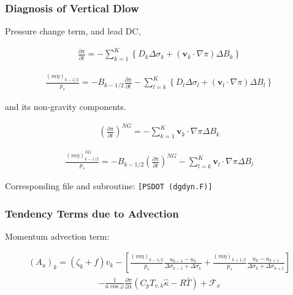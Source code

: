 \hypertarget{diagnosis-of-vertical-dlow}{%
\subsubsection{Diagnosis of Vertical
Dlow}\label{diagnosis-of-vertical-dlow}}

Pressure change term, and lead DC,

\begin{eqnarray}
  \frac{\partial \pi}{\partial t}
   = - \sum_{k=1}^{K} \left\{ D_k \Delta\sigma_k + ({\mathbf{v}}_k \cdot \nabla \pi)\Delta B_k \right\}
\end{eqnarray}

\begin{eqnarray}
  \frac{(m\dot{\eta})_{k-1/2}}{p_s}
   = - B_{k-1/2} \frac{\partial \pi}{\partial t}
    - \sum_{l=k}^{K}\left\{ D_l \Delta\sigma_l + ({\mathbf{v}}_l \cdot \nabla \pi)\Delta B_l \right\}
\end{eqnarray}

and its non-gravity components.

\begin{eqnarray}
  \left( \frac{\partial \pi}{\partial t} \right)^{NG}
   =   - \sum_{k=1}^{K} {\mathbf{v}}_{k} \cdot \nabla \pi  
       \Delta B_{k}
\end{eqnarray}

\begin{eqnarray}
  \frac{(m\dot{\eta})^{NG}_{k-1/2}}{p_s}
   = - B_{k-1/2} \left( \frac{\partial \pi}{\partial t} \right)^{NG}
    - \sum_{l=k}^{K} {\mathbf{v}}_{l} \cdot \nabla \pi
       \Delta B_{l}
\end{eqnarray}

Corresponding file and subroutine: \texttt{{[}PSDOT\ (dgdyn.F){]}}

\hypertarget{tendency-terms-due-to-advection}{%
\subsubsection{Tendency Terms due to
Advection}\label{tendency-terms-due-to-advection}}

Momentum advection term:

\begin{eqnarray}
  (A_u)_k
    =  ( \zeta_k + f ) v_k
             - \left[ \frac{(m\dot{\eta})_{k-1/2}}{p_s} \frac{u_{k-1} - u_k}{\Delta\sigma_{k-1}+\Delta\sigma_k}
               + \frac{(m\dot{\eta})_{k+1/2}}{p_s} \frac{u_k   - u_{k+1}}{\Delta\sigma_{k}+\Delta\sigma_{k+1}} \right]
\end{eqnarray} \begin{eqnarray}
           - \frac{1}{a\cos\varphi} \frac{\partial \pi}{\partial \lambda}(C_p T_{v,k}\hat{\kappa}-R\bar{T})
             + {\mathcal F}_x
\end{eqnarray}

